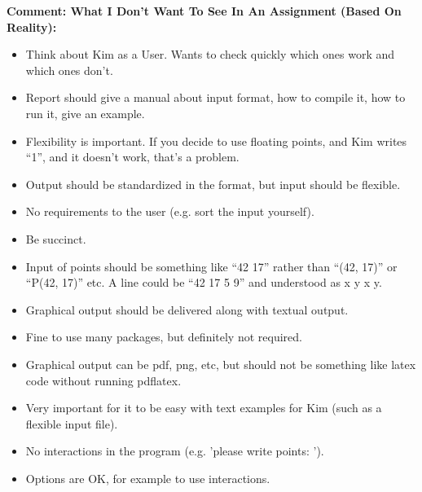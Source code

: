 \textbf{Comment: What I Don't Want To See In An Assignment (Based On Reality):}
\begin{itemize}
	\item Think about Kim as a User. Wants to check quickly which ones work and which ones don't.
	\item Report should give a manual about input format, how to compile it, how to run it, give an example.
	\item Flexibility is important. If you decide to use floating points, and Kim writes ``1'', and it doesn't work, that's a problem.
	\item Output should be standardized in the format, but input should be flexible.
	\item No requirements to the user (e.g. sort the input yourself).
	\item Be succinct.
	\item Input of points should be something like ``42 17'' rather than ``(42, 17)'' or ``P(42, 17)'' etc. A line could be ``42 17 5 9'' and understood as x y x y.
	\item Graphical output should be delivered along with textual output.
	\item Fine to use many packages, but definitely not required.
	\item Graphical output can be pdf, png, etc, but should not be something like latex code without running pdflatex.
	\item Very important for it to be easy with text examples for Kim (such as a flexible input file).
	\item No interactions in the program (e.g. 'please write points: ').
	\item Options are OK, for example to use interactions.
\end{itemize}

